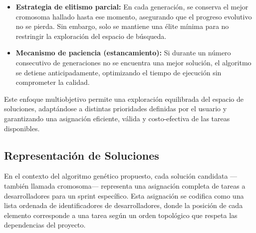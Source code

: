 \begin{itemize}
    \item \textbf{Estrategia de elitismo parcial:} En cada generación, se conserva el mejor cromosoma hallado hasta ese momento, asegurando que el progreso evolutivo no se pierda. Sin embargo, solo se mantiene una élite mínima para no restringir la exploración del espacio de búsqueda.

    \item \textbf{Mecanismo de paciencia (estancamiento):} Si durante un número consecutivo de generaciones no se encuentra una mejor solución, el algoritmo se detiene anticipadamente, optimizando el tiempo de ejecución sin comprometer la calidad.
\end{itemize}

Este enfoque multiobjetivo permite una exploración equilibrada del espacio de soluciones, adaptándose a distintas prioridades definidas por el usuario y garantizando una asignación eficiente, válida y costo-efectiva de las tareas disponibles.








\subsection{Representación de Soluciones}

En el contexto del algoritmo genético propuesto, cada solución candidata —también llamada cromosoma— representa una asignación completa de tareas a desarrolladores para un sprint específico. Esta asignación se codifica como una lista ordenada de identificadores de desarrolladores, donde la posición de cada elemento corresponde a una tarea según un orden topológico que respeta las dependencias del proyecto.

